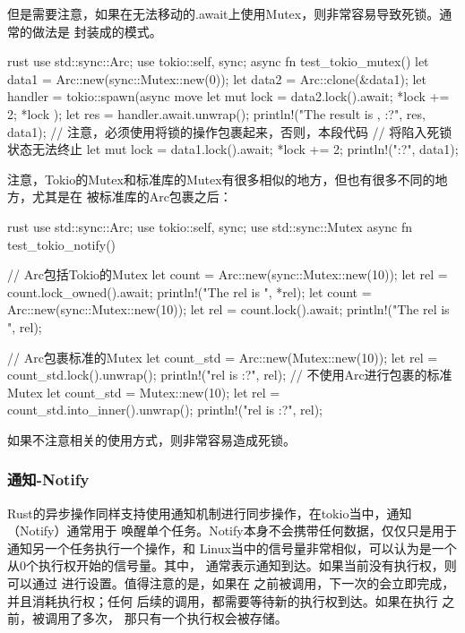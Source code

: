 但是需要注意，如果在无法移动的.await上使用Mutex，则非常容易导致死锁。通常的做法是
封装成的模式。
\begin{code-block}{rust}
use std::sync::Arc;
use tokio::{self, sync};
async fn test_tokio_mutex() {
    let data1 = Arc::new(sync::Mutex::new(0));
    let data2 = Arc::clone(&data1);
    let handler = tokio::spawn(async move {
        let mut lock = data2.lock().await;
        *lock += 2;
        *lock
    });
    let res = handler.await.unwrap();
    println!("The result is {}, {:?}", res, data1);
    // 注意，必须使用{}将锁的操作包裹起来，否则，本段代码
    // 将陷入死锁状态无法终止
    {
        let mut lock = data1.lock().await;
        *lock += 2;
    }
    println!("{:?}", data1);
}
\end{code-block}

注意，Tokio的Mutex和标准库的Mutex有很多相似的地方，但也有很多不同的地方，尤其是在
被标准库的Arc包裹之后：
\begin{code-block}{rust}
use std::sync::Arc;
use tokio::{self, sync};
use std::sync::Mutex
async fn test_tokio_notify() {
    // Arc包括Tokio的Mutex
    let count = Arc::new(sync::Mutex::new(10));
    let rel = count.lock_owned().await;
    println!("The rel is {}", *rel);
    let count = Arc::new(sync::Mutex::new(10));
    let rel = count.lock().await;
    println!("The rel is {}", rel);

    // Arc包裹标准的Mutex
    let count_std = Arc::new(Mutex::new(10));
    let rel = count_std.lock().unwrap();
    println!("rel is {:?}", rel);
    // 不使用Arc进行包裹的标准Mutex
    let count_std = Mutex::new(10);
    let rel = count_std.into_inner().unwrap();
    println!("rel is {:?}", rel);
}
\end{code-block}
如果不注意相关的使用方式，则非常容易造成死锁。

\subsubsection{通知-Notify}
Rust的异步操作同样支持使用通知机制进行同步操作，在tokio当中，通知（Notify）通常用于
唤醒单个任务。Notify本身不会携带任何数据，仅仅只是用于通知另一个任务执行一个操作，和
Linux当中的信号量非常相似，可以认为是一个从0个执行权开始的信号量。其中，
通常表示通知到达。如果当前没有执行权，则可以通过
进行设置。值得注意的是，如果在
之前被调用，下一次的会立即完成，并且消耗执行权；任何
后续的调用，都需要等待新的执行权到达。如果在执行
之前，被调用了多次，
那只有一个执行权会被存储。

